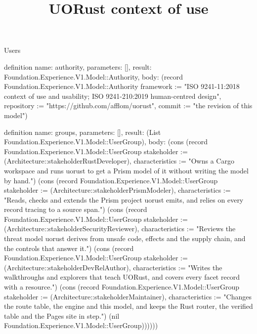 \begin{lexlean}{Users}
\title{UORust context of use}
\begin{semanticmodule}
definition{
  name: authority,
  parameters: [],
  result: Foundation.Experience.V1.Model::Authority,
  body: (record Foundation.Experience.V1.Model::Authority {framework := "ISO 9241-11:2018 context of use and usability; ISO 9241-210:2019 human-centred design", repository := "https://github.com/afflom/uorust", commit := "the revision of this model"})
}

definition{
  name: groups,
  parameters: [],
  result: (List Foundation.Experience.V1.Model::UserGroup),
  body: (cons (record Foundation.Experience.V1.Model::UserGroup {stakeholder := (Architecture::stakeholderRustDeveloper), characteristics := "Owns a Cargo workspace and runs uorust to get a Prism model of it without writing the model by hand."}) (cons (record Foundation.Experience.V1.Model::UserGroup {stakeholder := (Architecture::stakeholderPrismModeler), characteristics := "Reads, checks and extends the Prism project uorust emits, and relies on every record tracing to a source span."}) (cons (record Foundation.Experience.V1.Model::UserGroup {stakeholder := (Architecture::stakeholderSecurityReviewer), characteristics := "Reviews the threat model uorust derives from unsafe code, effects and the supply chain, and the controls that answer it."}) (cons (record Foundation.Experience.V1.Model::UserGroup {stakeholder := (Architecture::stakeholderDevRelAuthor), characteristics := "Writes the walkthroughs and explorers that teach UORust, and covers every facet record with a resource."}) (cons (record Foundation.Experience.V1.Model::UserGroup {stakeholder := (Architecture::stakeholderMaintainer), characteristics := "Changes the route table, the engine and this model, and keeps the Rust router, the verified table and the Pages site in step."}) (nil Foundation.Experience.V1.Model::UserGroup))))))
}


\end{semanticmodule}
\end{lexlean}
